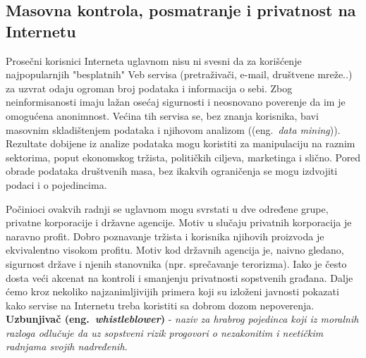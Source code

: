 \documentclass[a4paper]{article}
\begin{document}
\subsection{Masovna kontrola, posmatranje i privatnost na Internetu}
\label{subsec:podnaslovIP4}

\indent\indent Prosečni korisnici Interneta uglavnom nisu ni svesni da za korišćenje najpopularnjih "besplatnih" Veb servisa (pretraživači, e-mail, društvene mreže..) za uzvrat odaju ogroman broj podataka i informacija o sebi. Zbog neinformisanosti imaju lažan osećaj sigurnosti i neosnovano poverenje da im je omogućena anonimnost. Većina tih servisa se, bez znanja korisnika, bavi masovnim skladištenjem podataka i njihovom analizom ((eng.~{\em data mining})). Rezultate dobijene iz analize podataka mogu koristiti za manipulaciju na raznim sektorima, poput ekonomskog tržista, političkih ciljeva, marketinga i slično. Pored obrade podataka društvenih masa, bez ikakvih ograničenja se mogu izdvojiti podaci i o pojedincima.
		
	Počinioci ovakvih radnji se uglavnom mogu svrstati u dve određene grupe, privatne korporacije i državne agencije. Motiv u slučaju privatnih korporacija je naravno profit. Dobro poznavanje tržista i korisnika njihovih proizvoda je ekvivalentno visokom profitu. Motiv kod državnih agencija je, naivno gledano, sigurnost države i njenih stanovnika (npr. sprečavanje terorizma). Iako je često dosta veći akcenat na kontroli i smanjenju privatnosti sopstvenih građana. Dalje ćemo kroz nekoliko najzanimljivijih primera koji su izloženi javnosti pokazati kako servise na Internetu treba koristiti sa dobrom dozom nepoverenja.\\
	
\textbf{Uzbunjivač (eng.~{\em whistleblower})} - \textit{naziv za hrabrog pojedinca koji iz moralnih razloga odlučuje da uz sopstveni rizik progovori o nezakonitim i neetičkim radnjama svojih nadređenih.}
\end{document}
